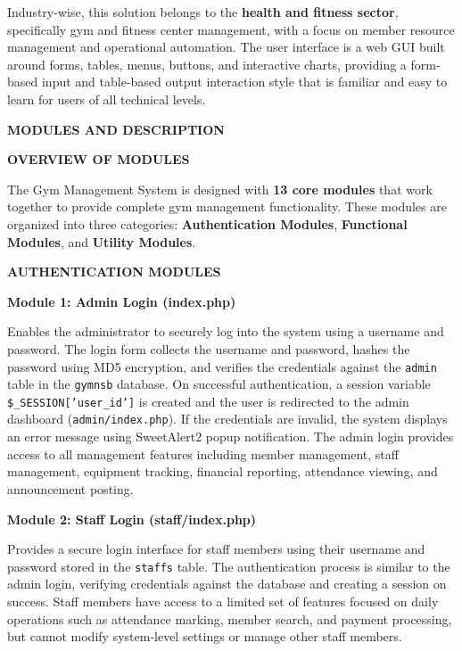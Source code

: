 \documentclass[12pt,a4paper]{report}
\begin{document}
Industry-wise, this solution belongs to the \textbf{health and fitness sector}, specifically gym and fitness center management, with a focus on member resource management and operational automation. The user interface is a web GUI built around forms, tables, menus, buttons, and interactive charts, providing a form-based input and table-based output interaction style that is familiar and easy to learn for users of all technical levels.

\newpage
\vspace*{\fill}
\begin{center}
{\LARGE \textbf{MODULES AND DESCRIPTION}}
\end{center}
\vspace*{\fill}

\newpage
\textbf{OVERVIEW OF MODULES}

The Gym Management System is designed with \textbf{13 core modules} that work together to provide complete gym management functionality. These modules are organized into three categories: \textbf{Authentication Modules}, \textbf{Functional Modules}, and \textbf{Utility Modules}.

\textbf{AUTHENTICATION MODULES}

\textbf{Module 1: Admin Login (index.php)}

Enables the administrator to securely log into the system using a username and password. The login form collects the username and password, hashes the password using MD5 encryption, and verifies the credentials against the \texttt{admin} table in the \texttt{gymnsb} database. On successful authentication, a session variable \texttt{\$\_SESSION['user\_id']} is created and the user is redirected to the admin dashboard (\texttt{admin/index.php}). If the credentials are invalid, the system displays an error message using SweetAlert2 popup notification. The admin login provides access to all management features including member management, staff management, equipment tracking, financial reporting, attendance viewing, and announcement posting.

\textbf{Module 2: Staff Login (staff/index.php)}

Provides a secure login interface for staff members using their username and password stored in the \texttt{staffs} table. The authentication process is similar to the admin login, verifying credentials against the database and creating a session on success. Staff members have access to a limited set of features focused on daily operations such as attendance marking, member search, and payment processing, but cannot modify system-level settings or manage other staff members.
\end{document}
